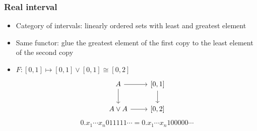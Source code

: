 \documentclass{beamer}
\begin{document}
\begin{frame}
  \frametitle{Real interval}
  \begin{itemize}
    \item Category of intervals: linearly ordered sets with least and greatest element
    \item Same functor: glue the greatest element of the first copy to the least element of the second copy
    \item $F: [0,1] \mapsto [0,1] \vee [0,1] \cong [0,2]$
      \begin{equation*}
        \begin{tikzcd}[ampersand replacement=\&]
          A \rar \dar \& \left[0,1\right] \dar \\
          A \vee A \rar \& {\left[0,2\right]}
        \end{tikzcd}
      \end{equation*}
      \begin{equation*}
        0.x_1 \dotsm x_n 011111\dotsm = 0.x_1 \dotsm x_n 100000\dotsm
      \end{equation*}
  \end{itemize}
\end{frame}
\end{document}

